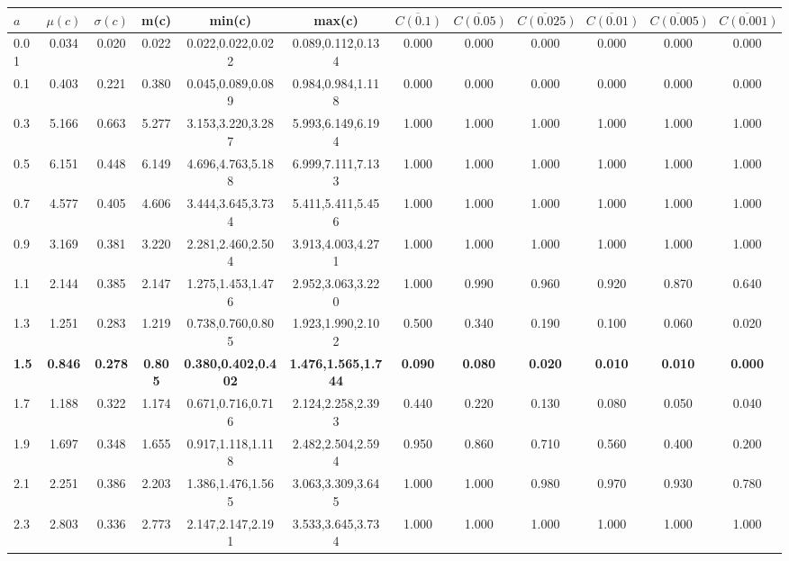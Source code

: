 \begin{table*}[h!]
\begin{center}
\begin{tabular}{| l | c | c | c | c | c | c | c | c | c | c | c |}\hline
$a$ & $\mu(c)$ & $\sigma(c)$ & m(c) & min(c) & max(c) & $\overline{C(0.1)}$ & $\overline{C(0.05)}$ & $\overline{C(0.025)}$ & $\overline{C(0.01)}$ & $\overline{C(0.005)}$ & $\overline{C(0.001)}$ \\\hline\hline
0.01 & 0.034 & 0.020 & 0.022 & 0.022,0.022,0.022 & 0.089,0.112,0.134  & 0.000  & 0.000  & 0.000  & 0.000  & 0.000  & 0.000 \\\hline
0.1 & 0.403 & 0.221 & 0.380 & 0.045,0.089,0.089 & 0.984,0.984,1.118  & 0.000  & 0.000  & 0.000  & 0.000  & 0.000  & 0.000 \\\hline
0.3 & 5.166 & 0.663 & 5.277 & 3.153,3.220,3.287 & 5.993,6.149,6.194  & 1.000  & 1.000  & 1.000  & 1.000  & 1.000  & 1.000 \\\hline
0.5 & 6.151 & 0.448 & 6.149 & 4.696,4.763,5.188 & 6.999,7.111,7.133  & 1.000  & 1.000  & 1.000  & 1.000  & 1.000  & 1.000 \\\hline
0.7 & 4.577 & 0.405 & 4.606 & 3.444,3.645,3.734 & 5.411,5.411,5.456  & 1.000  & 1.000  & 1.000  & 1.000  & 1.000  & 1.000 \\\hline
0.9 & 3.169 & 0.381 & 3.220 & 2.281,2.460,2.504 & 3.913,4.003,4.271  & 1.000  & 1.000  & 1.000  & 1.000  & 1.000  & 1.000 \\\hline
1.1 & 2.144 & 0.385 & 2.147 & 1.275,1.453,1.476 & 2.952,3.063,3.220  & 1.000  & 0.990  & 0.960  & 0.920  & 0.870  & 0.640 \\\hline
1.3 & 1.251 & 0.283 & 1.219 & 0.738,0.760,0.805 & 1.923,1.990,2.102  & 0.500  & 0.340  & 0.190  & 0.100  & 0.060  & 0.020 \\\hline
{\bf 1.5} & {\bf 0.846} & {\bf 0.278} & {\bf 0.805} & {\bf 0.380,0.402,0.402} & {\bf 1.476,1.565,1.744} & {\bf 0.090} & {\bf 0.080} & {\bf 0.020} & {\bf 0.010} & {\bf 0.010} & {\bf 0.000} \\\hline
1.7 & 1.188 & 0.322 & 1.174 & 0.671,0.716,0.716 & 2.124,2.258,2.393  & 0.440  & 0.220  & 0.130  & 0.080  & 0.050  & 0.040 \\\hline
1.9 & 1.697 & 0.348 & 1.655 & 0.917,1.118,1.118 & 2.482,2.504,2.594  & 0.950  & 0.860  & 0.710  & 0.560  & 0.400  & 0.200 \\\hline
2.1 & 2.251 & 0.386 & 2.203 & 1.386,1.476,1.565 & 3.063,3.309,3.645  & 1.000  & 1.000  & 0.980  & 0.970  & 0.930  & 0.780 \\\hline
2.3 & 2.803 & 0.336 & 2.773 & 2.147,2.147,2.191 & 3.533,3.645,3.734  & 1.000  & 1.000  & 1.000  & 1.000  & 1.000  & 1.000 \\\hline

\end{tabular}
\end{center}
\end{table*}
